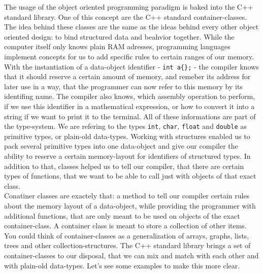 \begin{challenge}
    \begin{chadescription}
    The usage of the object oriented programming paradigm is baked into the C++ standard library.
    One of this concept are the C++ standard container-classes.
    The idea behind these classes are the same as the ideas behind every other object oriented design: to bind structured data and beahvior together.
    While the computer itself only knows plain RAM adresses, programming languages implement concepts for us to add specific rules to certain ranges of our memory.
    With the instantiation of a data-object identifier - \texttt{int a\{\};} - the compiler knows that it should reserve a certain amount of memory, and remeber its address for later use in a way, that the programmer can now refer to this memory by its identifing name. 
    The compiler also knows, which assembly operation to perform, if we use this identifier in a mathematical expression, or how to convert it into a string if we want to print it to the terminal.
    All of these informations are part of the type-system.
    We are refering to the types \texttt{int}, \texttt{char}, \texttt{float} and \texttt{double} as primitive types, or plain-old data-types.
    Working with structures enabled us to pack several primitive types into one data-object and give our compiler the ability to reserve a certain memory-layout for identifiers of structured types.
    In addition to that, classes helped us to tell our compiler, that there are certain types of functions, that we want to be able to call just with objects of that exact class.\\
    Conatiner classes are exactely that: a method to tell our compiler certain rules about the memory layout of a data-object, while providing the programmer with additional functions, that are only meant to be used on objects of the exact container-class.
    A container class is meant to store a collection of other items. 
    You could think of container-classes as a generalization of arrays, graphs, lists, trees and other collection-structures.
    The C++ standard library brings a set of container-classes to our disposal, that we can mix and match with each other and with plain-old data-types.
    Let's see some examples to make this more clear.
    
    \end{chadescription}


\end{challenge}
